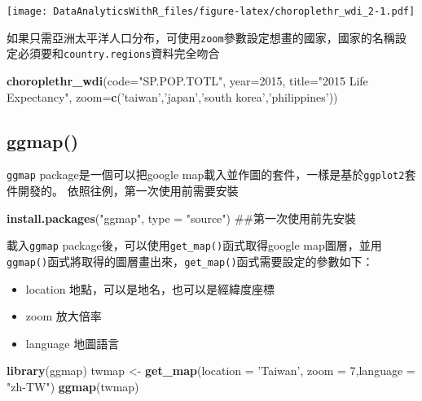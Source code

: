 \documentclass[]{book}
\newenvironment{Shaded}{\begin{snugshade}}{\end{snugshade}}
\newcommand{\KeywordTok}[1]{\textcolor[rgb]{0.13,0.29,0.53}{\textbf{{#1}}}}
\newcommand{\DataTypeTok}[1]{\textcolor[rgb]{0.13,0.29,0.53}{{#1}}}
\newcommand{\DecValTok}[1]{\textcolor[rgb]{0.00,0.00,0.81}{{#1}}}
\newcommand{\StringTok}[1]{\textcolor[rgb]{0.31,0.60,0.02}{{#1}}}
\newcommand{\NormalTok}[1]{{#1}}
\providecommand{\tightlist}{%
  \setlength{\itemsep}{0pt}\setlength{\parskip}{0pt}}
\theoremstyle{definition}
\theoremstyle{definition}
\theoremstyle{remark}
\begin{document}
\texttt{[image: DataAnalyticsWithR\_files/figure-latex/choroplethr\_wdi\_2-1.pdf]}

如果只需亞洲太平洋人口分布，可使用\texttt{zoom}參數設定想畫的國家，國家的名稱設定必須要和\texttt{country.regions}資料完全吻合

\begin{Shaded}
\begin{Highlighting}[]
\KeywordTok{choroplethr_wdi}\NormalTok{(}\DataTypeTok{code=}\StringTok{"SP.POP.TOTL"}\NormalTok{, }\DataTypeTok{year=}\DecValTok{2015}\NormalTok{, }
                \DataTypeTok{title=}\StringTok{"2015 Life Expectancy"}\NormalTok{,}
                \DataTypeTok{zoom=}\KeywordTok{c}\NormalTok{(}\StringTok{'taiwan'}\NormalTok{,}\StringTok{'japan'}\NormalTok{,}\StringTok{'south korea'}\NormalTok{,}\StringTok{'philippines'}\NormalTok{))}
\end{Highlighting}
\end{Shaded}

\subsection{ggmap()}\label{ggmap}

\texttt{ggmap}\citep{R-ggmap} package是一個可以把google
map載入並作圖的套件，一樣是基於\texttt{ggplot2}套件開發的。
依照往例，第一次使用前需要安裝

\begin{Shaded}
\begin{Highlighting}[]
\KeywordTok{install.packages}\NormalTok{(}\StringTok{"ggmap"}\NormalTok{, }\DataTypeTok{type =} \StringTok{"source"}\NormalTok{) ##第一次使用前先安裝}
\end{Highlighting}
\end{Shaded}

載入\texttt{ggmap}\citep{R-ggmap}
package後，可以使用\texttt{get\_map()}函式取得google
map圖層，並用\texttt{ggmap()}函式將取得的圖層畫出來，\texttt{get\_map()}函式需要設定的參數如下：

\begin{itemize}
\tightlist
\item
  location 地點，可以是地名，也可以是經緯度座標
\item
  zoom 放大倍率
\item
  language 地圖語言
\end{itemize}

\begin{Shaded}
\begin{Highlighting}[]
\KeywordTok{library}\NormalTok{(ggmap)}
\NormalTok{twmap <-}\StringTok{ }\KeywordTok{get_map}\NormalTok{(}\DataTypeTok{location =} \StringTok{'Taiwan'}\NormalTok{, }\DataTypeTok{zoom =} \DecValTok{7}\NormalTok{,}\DataTypeTok{language =} \StringTok{"zh-TW"}\NormalTok{)}
\KeywordTok{ggmap}\NormalTok{(twmap)}
\end{Highlighting}
\end{Shaded}
\end{document}
